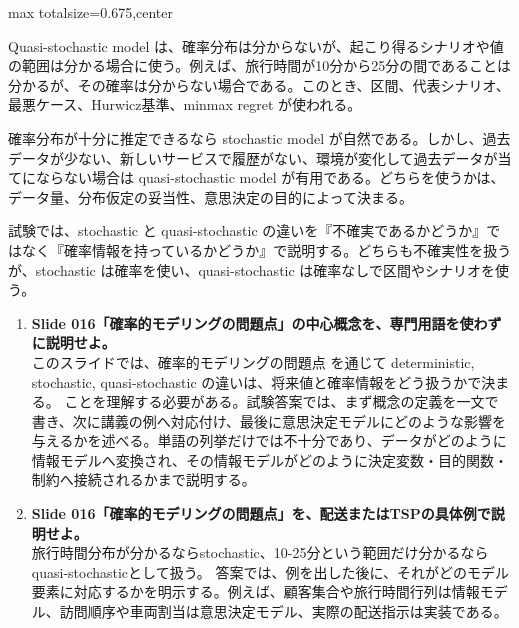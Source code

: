 \begin{adjustbox}{max totalsize={\textwidth}{0.675\textheight},center}
\begin{minipage}{\textwidth}
\begin{minipage}[t]{0.485\textwidth}
Quasi-stochastic model は、確率分布は分からないが、起こり得るシナリオや値の範囲は分かる場合に使う。例えば、旅行時間が10分から25分の間であることは分かるが、その確率は分からない場合である。このとき、区間、代表シナリオ、最悪ケース、Hurwicz基準、minmax regret が使われる。\par
確率分布が十分に推定できるなら stochastic model が自然である。しかし、過去データが少ない、新しいサービスで履歴がない、環境が変化して過去データが当てにならない場合は quasi-stochastic model が有用である。どちらを使うかは、データ量、分布仮定の妥当性、意思決定の目的によって決まる。\par
試験では、stochastic と quasi-stochastic の違いを『不確実であるかどうか』ではなく『確率情報を持っているかどうか』で説明する。どちらも不確実性を扱うが、stochastic は確率を使い、quasi-stochastic は確率なしで区間やシナリオを使う。\par
{}
\begin{enumerate}
\item \textbf{Slide 016「確率的モデリングの問題点」の中心概念を、専門用語を使わずに説明せよ。}\\このスライドでは、確率的モデリングの問題点 を通じて deterministic, stochastic, quasi-stochastic の違いは、将来値と確率情報をどう扱うかで決まる。 ことを理解する必要がある。試験答案では、まず概念の定義を一文で書き、次に講義の例へ対応付け、最後に意思決定モデルにどのような影響を与えるかを述べる。単語の列挙だけでは不十分であり、データがどのように情報モデルへ変換され、その情報モデルがどのように決定変数・目的関数・制約へ接続されるかまで説明する。
\item \textbf{Slide 016「確率的モデリングの問題点」を、配送またはTSPの具体例で説明せよ。}\\旅行時間分布が分かるならstochastic、10-25分という範囲だけ分かるならquasi-stochasticとして扱う。 答案では、例を出した後に、それがどのモデル要素に対応するかを明示する。例えば、顧客集合や旅行時間行列は情報モデル、訪問順序や車両割当は意思決定モデル、実際の配送指示は実装である。
\end{enumerate}
\end{minipage}
\end{minipage}
\end{adjustbox}

